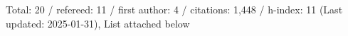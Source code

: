 Total: 20 / refereed: 11 / first author: 4 / citations: 1,448 / h-index: 11 (Last updated: 2025-01-31), List attached below
